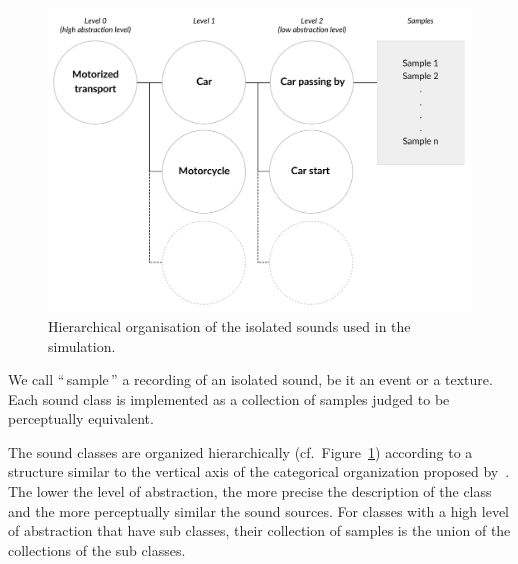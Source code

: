 \documentclass[12pt]{elsarticle}
\newcommand{\ie}{\emph{i.\,e.}}
\newcommand{\cf}{cf.}
\newcommand{\myfloatalign}{\centering}
\begin{document}
\begin{figure}[t]
        \myfloatalign
        \includegraphics[width=\linewidth]{gfx/3.pdf}
       \caption{Hierarchical organisation of the isolated sounds used in the simulation.}\label{fig:orgDb}
\end{figure}


We call ``\,sample\,'' a recording of an isolated sound, be it an event or a texture. Each sound class is implemented as a collection of samples judged to be perceptually equivalent.


The sound classes are organized hierarchically (\cf~Figure~\ref{fig:orgDb}) according to a structure similar to the vertical axis of the categorical organization proposed by~\cite{rosch1978cognition}. The lower the level of abstraction, the more precise the description of the class and the more perceptually similar the sound sources. For classes with a high level of abstraction that have sub classes, their collection of samples is the union of the collections of the sub classes.
\end{document}
